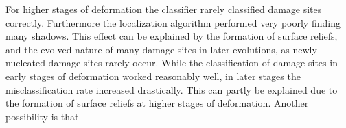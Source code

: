 For higher stages of deformation the classifier rarely classified damage sites correctly. Furthermore the localization algorithm performed very poorly finding many shadows. This effect can be explained by the formation of surface reliefs, and the evolved nature of many damage sites in later evolutions, as newly nucleated damage sites rarely occur. 
While the classification of damage sites in early stages of deformation worked reasonably well, in later stages the misclassification rate increased drastically. This can partly be explained due to the formation of surface reliefs at higher stages of deformation. Another possibility is that 

%
%
